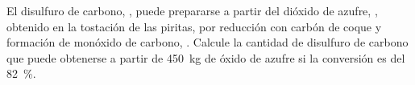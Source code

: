 El disulfuro de carbono, , puede prepararse a partir del dióxido de azufre, , obtenido en la tostación de las piritas, por reducción con carbón de coque y formación de monóxido de carbono, . Calcule la cantidad de disulfuro de carbono que puede obtenerse a partir de \SI{450}{\kilogram} de óxido de azufre si la conversión es del \SI{82}{\percent}.



